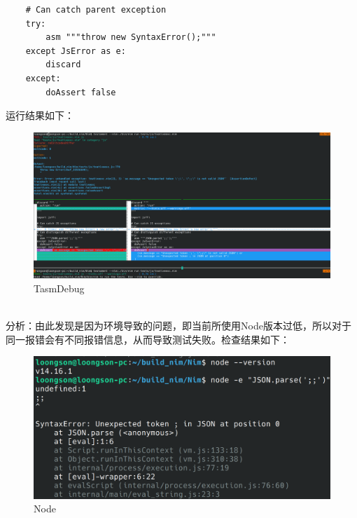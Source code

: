 \documentclass[UTF8]{ctexart}
\begin{document}
\begin{itemize}[leftmargin=3.5em]
\begin{tcolorbox}[colback=gray!20, colframe=gray!20, rounded corners, boxrule=-5pt, height=0.72\textheight, width=0.9\textwidth, left=0pt, right=0pt, top=0pt, bottom=0pt]
\begin{verbatim}
	# Can catch parent exception
	try:
  		asm """throw new SyntaxError();"""
	except JsError as e:
  		discard
	except:
  		doAssert false
				\end{verbatim}
			\end{tcolorbox}
			运行结果如下：
			\newpage
			\begin{figure}[htbp]
				\centering
				\includegraphics[width=\linewidth]{tnativeexc_fix_show.png}
				\caption{TasmDebug}
				\label{fig:node_err}
			\end{figure} \\
			分析：由此发现是因为环境导致的问题，即当前所使用Node版本过低，所以对于同一报错会有不同报错信息，从而导致测试失败。检查结果如下：
			\begin{figure}[htbp]
				\centering
				\includegraphics[width=0.8\linewidth]{tnativeexc_node_err_msg.png}
				\caption{Node}
				\label{fig:tasm_err}
			\end{figure}
		\end{itemize}
\end{document}
